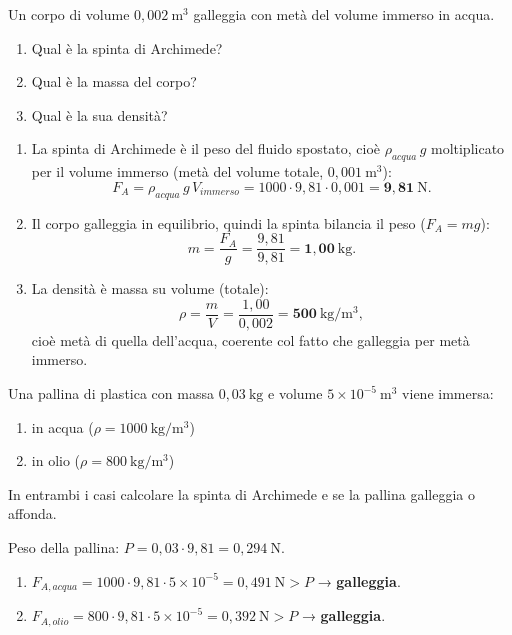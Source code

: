 \begin{question}[ID=3.2, subtitle={Corpo che galleggia con metà volume immerso}, tags={fluidi, Archimede, galleggiamento}, difficulty=facile]
Un corpo di volume $0{,}002\ \mathrm{m^3}$ galleggia con metà del volume immerso in acqua.
\begin{enumerate}
    \item Qual è la spinta di Archimede?
    \item Qual è la massa del corpo?
    \item Qual è la sua densità?
\end{enumerate}
\begin{solution}
\begin{enumerate}
    \item La spinta di Archimede è il peso del fluido spostato, cioè $\rho_{acqua}\,g$ moltiplicato per il volume immerso (metà del volume totale, $0{,}001\ \mathrm{m^3}$):
    \[
    F_A = \rho_{acqua}\,g\,V_{immerso} = 1000\cdot 9{,}81\cdot 0{,}001 = \mathbf{9{,}81\ \mathrm{N}}.
    \]
    \item Il corpo galleggia in equilibrio, quindi la spinta bilancia il peso ($F_A = mg$):
    \[
    m = \frac{F_A}{g} = \frac{9{,}81}{9{,}81} = \mathbf{1{,}00\ \mathrm{kg}}.
    \]
    \item La densità è massa su volume (totale):
    \[
    \rho = \frac{m}{V} = \frac{1{,}00}{0{,}002} = \mathbf{500\ \mathrm{kg/m^3}},
    \]
    cioè metà di quella dell'acqua, coerente col fatto che galleggia per metà immerso.
\end{enumerate}
\end{solution}
\end{question}


\begin{question}[ID=3.3, subtitle={Pallina di plastica in acqua e in olio}, tags={fluidi, Archimede, galleggiamento}, difficulty=media]
Una pallina di plastica con massa $0{,}03\ \mathrm{kg}$ e volume $5\times10^{-5}\ \mathrm{m^3}$ viene immersa:
\begin{enumerate}
    \item in acqua ($\rho = 1000\ \mathrm{kg/m^3}$)
    \item in olio ($\rho = 800\ \mathrm{kg/m^3}$)
\end{enumerate}
In entrambi i casi calcolare la spinta di Archimede e se la pallina galleggia o affonda.
\begin{solution}
Peso della pallina: $P = 0{,}03 \cdot 9{,}81 = 0{,}294\ \mathrm{N}$.
\begin{enumerate}
    \item $F_{A,acqua} = 1000\cdot9{,}81\cdot5\times10^{-5} = 0{,}491\ \mathrm{N} > P$ → \textbf{galleggia}.
    \item $F_{A,olio} = 800\cdot9{,}81\cdot5\times10^{-5} = 0{,}392\ \mathrm{N} > P$ → \textbf{galleggia}.
\end{enumerate}
\end{solution}
\end{question}

